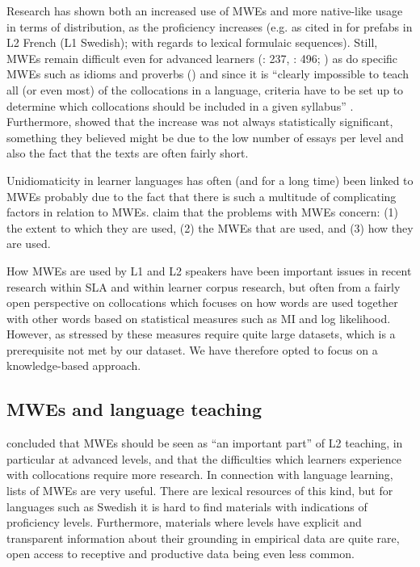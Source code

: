 \documentclass[output=paper,colorlinks,citecolor=brown]{langscibook}
\begin{document}
Research has shown both an increased use of MWEs and more native-like usage in terms of distribution, as the proficiency increases (e.g. \cite{forsberg2006langage} as cited in \cite{ringbom2012country} for prefabs in L2 French (L1 Swedish); \cite{forsberg2010can} with regards to lexical formulaic sequences). 
Still, MWEs remain difficult even for advanced learners (\cite{nesselhauf2003use}: 237, \cite{ringbom2012country}: 496; \cite{ekberg2013grammatik}) as do specific MWEs such as idioms and proverbs (\cite{abrahamsson2009age, prentice2010kappen}) and since it is ``clearly impossible to teach all (or even most) of the collocations in a language, criteria have to be set up to determine which collocations should be included in a given syllabus'' \citep[][238]{nesselhauf2003use}. Furthermore, \citet[][150]{forsberg2010can} showed that the increase was not always statistically significant, something they believed might be due to the low number of essays per level and also the fact that the texts are often fairly short. 

Unidiomaticity in learner languages has often (and for a long time) been linked to MWEs \citep[cf.][]{pawley1983two} probably due to the fact that there is such a multitude of complicating factors in relation to MWEs. 
\citet[][78]{de2014automated} claim that the problems with MWEs concern: (1) the extent to which they are used, (2) the MWEs that are used, and (3) how they are used.  

How MWEs are used by L1 and L2 speakers have been important issues in recent research within SLA and within learner corpus research, but often from a fairly open perspective on collocations which focuses on how words are used together with other words based on statistical measures such as MI and log likelihood. However, as stressed by \citet[][148]{forsberg2010can} these measures require quite large datasets, which is a prerequisite not met by our dataset. We have therefore opted to focus on a knowledge-based approach.


\subsection{MWEs and language teaching}\label{sec:MWElangteach}

\citet[][223]{nesselhauf2003use} concluded that MWEs should be seen as ``an important part'' of L2 teaching, in particular at advanced levels, and that the difficulties which learners experience with collocations require more research. In connection with language learning, lists of MWEs are very useful. There are lexical resources of this kind, but for languages such as Swedish it is hard to find 
materials with indications of proficiency levels. Furthermore, materials where levels have explicit and transparent information about 
their grounding in empirical data are quite rare, open access to receptive and productive data being even less common.
\end{document}
